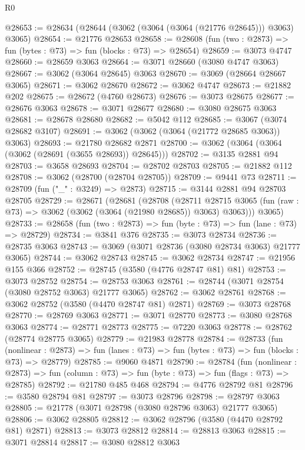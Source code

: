 \begin{lexlean}{R0}
\begin{coremodule}
@28653 := @28634 (@28644 (@3062 (@3064 (@3064 (@21776 @28645))) @3063) @3065)
@28654 := @21776 @28653
@28658 := @28608 (fun (two : @2873) => fun (bytes : @73) => fun (blocks : @73) => @28654)
@28659 := @3073 @4747
@28660 := @28659 @3063
@28664 := @3071 @28660 (@3080 @4747 @3063)
@28667 := @3062 (@3064 @28645) @3063
@28670 := @3069 (@28664 @28667 @3065)
@28671 := @3062 @28670
@28672 := @3062 @4747
@28673 := @21882 @202
@28675 := @28672 (@4760 @28673)
@28676 := @3073 @28675
@28677 := @28676 @3063
@28678 := @3071 @28677
@28680 := @3080 @28675 @3063
@28681 := @28678 @28680
@28682 := @5042 @112
@28685 := @3067 (@3074 @28682 @3107)
@28691 := @3062 (@3062 (@3064 (@21772 @28685 @3063)) @3063)
@28693 := @21780 @28682 @2871
@28700 := @3062 (@3064 (@3064 (@3062 (@28691 (@3655 @28693)) @28645)))
@28702 := @3135 @2881 @94
@28703 := @3658 @28693
@28704 := @28702 @28703
@28705 := @21882 @112
@28708 := @3062 (@28700 (@28704 @28705))
@28709 := @9441 @73
@28711 := @28709 (fun ("_" : @3249) => @2873)
@28715 := @3144 @2881 @94 @28703 @28705
@28729 := @28671
    (@28681
      (@28708
        (@28711
          @28715
          @3065
          (fun (raw : @73) => @3062 (@3062 (@3064 (@21980 @28685)) @3063) @3063)))
      @3065)
@28733 := @28658 (fun (two : @2873) => fun (byte : @73) => fun (lane : @73) => @28729)
@28734 := @3841 @376
@28735 := @3073 @28734
@28736 := @28735 @3063
@28743 := @3069 (@3071 @28736 (@3080 @28734 @3063) @21777 @3065)
@28744 := @3062 @28743
@28745 := @3062 @28734
@28747 := @21956 @155 @366
@28752 := @28745 (@3580 (@4776 @28747 @81) @81)
@28753 := @3073 @28752
@28754 := @28753 @3063
@28761 := @28744 (@3071 @28754 (@3080 @28752 @3063) @21777 @3065)
@28762 := @3062 @28761
@28768 := @3062 @28752 (@3580 (@4470 @28747 @81) @2871)
@28769 := @3073 @28768
@28770 := @28769 @3063
@28771 := @3071 @28770
@28773 := @3080 @28768 @3063
@28774 := @28771 @28773
@28775 := @7220 @3063
@28778 := @28762 (@28774 @28775 @3065)
@28779 := @21983 @28778
@28784 := @28733
    (fun (nonlinear : @2873) =>
    fun (lanes : @73) => fun (bytes : @73) => fun (blocks : @73) => @28779)
@28785 := @9060 @4871
@28790 := @28784
    (fun (nonlinear : @2873) =>
    fun (column : @73) => fun (byte : @73) => fun (flags : @73) => @28785)
@28792 := @21780 @485 @468
@28794 := @4776 @28792 @81
@28796 := @3580 @28794 @81
@28797 := @3073 @28796
@28798 := @28797 @3063
@28805 := @21778 (@3071 @28798 (@3080 @28796 @3063) @21777 @3065)
@28806 := @3062 @28805
@28812 := @3062 @28796 (@3580 (@4470 @28792 @81) @2871)
@28813 := @3073 @28812
@28814 := @28813 @3063
@28815 := @3071 @28814
@28817 := @3080 @28812 @3063

\end{coremodule}
\end{lexlean}
